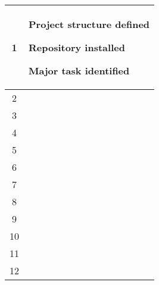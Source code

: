 \begin{center}
\begin{longtable}{|c|p{12cm}|}
1 & 
\begin{journal}
  \item Project structure defined
  \item Repository installed
  \item Major task identified
\end{journal}
\\ \hline
2 & 
\begin{journal}
  \item 
\end{journal}
\\ \hline
3 & 
\begin{journal}
  \item 
\end{journal}
\\ \hline
4 & 
\begin{journal}
  \item 
\end{journal}
\\ \hline
5 & 
\begin{journal}
  \item 
\end{journal}
\\ \hline
6 & 
\begin{journal}
  \item 
\end{journal}
\\ \hline
7 & 
\begin{journal}
  \item 
\end{journal}
\\ \hline
8 & 
\begin{journal}
  \item 
\end{journal}
\\ \hline
9 & 
\begin{journal}
  \item 
\end{journal}
\\ \hline
10 & 
\begin{journal}
  \item 
\end{journal}
\\ \hline
11 & 
\begin{journal}
  \item 
\end{journal}
\\ \hline
12 & 
\begin{journal}
  \item 

\end{journal}
\end{longtable}
\end{center}
